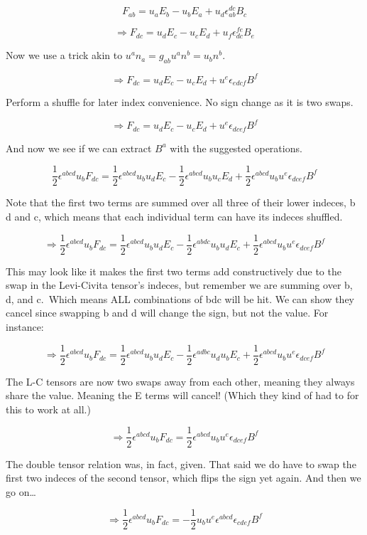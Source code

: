 \documentclass[landscape,letterpaper,10pt,english]{article}
\begin{document}
\[ F_{ab} = u_aE_b - u_bE_a + u_d\epsilon^{dc}_{ab} B_c \]

\[ \Rightarrow F_{dc} = u_dE_c - u_cE_d + u_f\epsilon^{fe}_{dc} B_e \]

Now we use a trick akin to \(u^an_a = g_{ab}u^an^b = u_bn^b\).

\[ \Rightarrow F_{dc} = u_dE_c - u_cE_d + u^e\epsilon_{edcf} B^f \]

Perform a shuffle for later index convenience. No sign change as it is
two swaps.

\[ \Rightarrow F_{dc} = u_dE_c - u_cE_d + u^e\epsilon_{dcef} B^f \]

    And now we see if we can extract \(B^a\) with the suggested operations.

\[ \frac12 \epsilon^{abcd}u_bF_{dc} = \frac12 \epsilon^{abcd}u_bu_dE_c - \frac12 \epsilon^{abcd}u_bu_cE_d + \frac12 \epsilon^{abcd}u_bu^e\epsilon_{dcef} B^f \]

    Note that the first two terms are summed over all three of their lower
indeces, b d and c, which means that each individual term can have its
indeces shuffled.

\[ \Rightarrow \frac12 \epsilon^{abcd}u_bF_{dc} = \frac12 \epsilon^{abcd}u_bu_dE_c - \frac12 \epsilon^{abdc}u_bu_dE_c + \frac12 \epsilon^{abcd}u_bu^e\epsilon_{dcef} B^f \]

This may look like it makes the first two terms add constructively due
to the swap in the Levi-Civita tensor's indeces, but remember we are
summing over b, d, and c.~Which means ALL combinations of bdc will be
hit. We can show they cancel since swapping b and d will change the
sign, but not the value. For instance:

\[ \Rightarrow \frac12 \epsilon^{abcd}u_bF_{dc} = \frac12 \epsilon^{abcd}u_bu_dE_c - \frac12 \epsilon^{adbc}u_du_bE_c + \frac12 \epsilon^{abcd}u_bu^e\epsilon_{dcef} B^f \]

The L-C tensors are now two swaps away from each other, meaning they
always share the value. Meaning the E terms will cancel! (Which they
kind of had to for this to work at all.)

\[ \Rightarrow \frac12 \epsilon^{abcd}u_bF_{dc} = \frac12 \epsilon^{abcd}u_bu^e\epsilon_{dcef} B^f \]

    The double tensor relation was, in fact, given. That said we do have to
swap the first two indeces of the second tensor, which flips the sign
yet again. And then we go on\ldots{}

\[ \Rightarrow \frac12 \epsilon^{abcd}u_bF_{dc} = -\frac12 u_bu^e\epsilon^{abcd}\epsilon_{cdef} B^f \]
\end{document}
